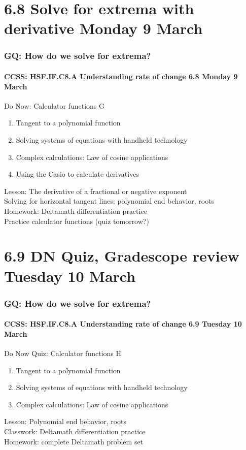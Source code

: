 \documentclass{beamer}
\begin{document}
\section{6.8 Solve for extrema with derivative \hfill Monday 9 March}
  \frame
  {
    \frametitle{GQ: How do we solve for extrema?}
    \framesubtitle{CCSS: HSF.IF.C8.A Understanding rate of change \hfill \alert{6.8 Monday 9 March}}
    \begin{block}{Do Now: Calculator functions G}
      \begin{enumerate}
        \item Tangent to a polynomial function
        \item Solving systems of equations with handheld technology
        \item Complex calculations: Law of cosine applications
        \item Using the Casio to calculate derivatives
      \end{enumerate}
      \end{block}
      Lesson: The derivative of a fractional or negative exponent \\ 
      Solving for horizontal tangent lines; polynomial end behavior, roots \\
      Homework: Deltamath differentiation practice \\ 
      Practice calculator functions (\alert{quiz tomorrow?})
      }

\section{6.9 DN Quiz, Gradescope review \hfill Tuesday 10 March}
  \frame
  {
    \frametitle{GQ: How do we solve for extrema?}
    \framesubtitle{CCSS: HSF.IF.C8.A Understanding rate of change \hfill \alert{6.9 Tuesday 10 March}}
    \begin{block}{Do Now Quiz: Calculator functions H}
      \begin{enumerate}
        \item Tangent to a polynomial function
        \item Solving systems of equations with handheld technology
        \item Complex calculations: Law of cosine applications
      \end{enumerate}
      \end{block}
      Lesson: Polynomial end behavior, roots \\
      Classwork: Deltamath differentiation practice \\ 
      Homework: complete Deltamath problem set
      }
            
\end{document}
